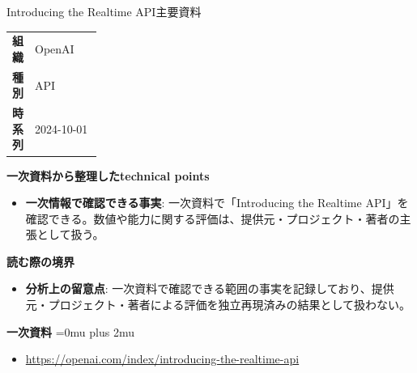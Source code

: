 \begin{technicalnote}{Introducing the Realtime API}{主要資料}
\begingroup
\begin{tabularx}{\linewidth}{@{}>{\bfseries}p{0.22\linewidth}X@{}}
組織 & OpenAI \\
種別 & API \\
時系列 & 2024-10-01 \\
\end{tabularx}
\smallskip
{\bfseries 一次資料から整理したtechnical points}
\begin{itemize}[leftmargin=1.5em,itemsep=0.35em]
\item \textbf{一次情報で確認できる事実}: 一次資料で「Introducing the Realtime API」を確認できる。数値や能力に関する評価は、提供元・プロジェクト・著者の主張として扱う。
\end{itemize}
\begin{minipage}{\linewidth}
{\bfseries 読む際の境界}
\begin{itemize}[leftmargin=1.5em,itemsep=0.35em]
\item \textbf{分析上の留意点}: 一次資料で確認できる範囲の事実を記録しており、提供元・プロジェクト・著者による評価を独立再現済みの結果として扱わない。
\end{itemize}
\begin{samepage}
{\bfseries 一次資料}
\begingroup\sloppy
\Urlmuskip=0mu plus 2mu\relax
\begin{itemize}[leftmargin=1.5em,itemsep=0.25em]
\item {\scriptsize\url{https://openai.com/index/introducing-the-realtime-api}}
\end{itemize}
\endgroup
\end{samepage}
\end{minipage}
\endgroup
\end{technicalnote}
\medskip

